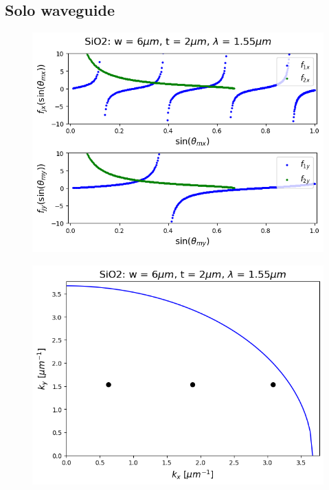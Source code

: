 \documentclass[conference, a4paper]{IEEEtran}
\begin{document}
\subsection{Solo waveguide}
\label{subsec:rectangle_solo}

\begin{figure}[H]
    \centering
    \includegraphics[scale=0.5]{characteristic_equation_SiO2.png}
    \caption{}
    \label{fig:cha_eq}
\end{figure}

\begin{figure}[H]
    \centering
    \includegraphics[scale=0.5]{modeshell_SiO2.png}
    \caption{}
    \label{fig:mode_shell}
\end{figure}
\end{document}
